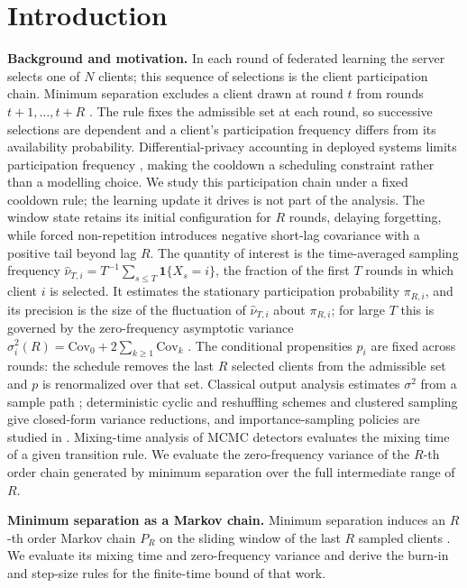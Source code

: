 \documentclass[twoside,11pt]{article}
\begin{document}
\section{Introduction}
\textbf{Background and motivation.} In each round of federated learning the server selects one of $N$ clients; this sequence of selections is the client participation chain. Minimum separation excludes a client drawn at round $t$ from rounds $t+1,\dots,t+R$ \citep{ref1}. The rule fixes the admissible set at each round, so successive selections are dependent and a client's participation frequency differs from its availability probability. Differential-privacy accounting in deployed systems limits participation frequency \citep{ref2,ref3}, making the cooldown a scheduling constraint rather than a modelling choice. We study this participation chain under a fixed cooldown rule; the learning update it drives is not part of the analysis. The window state retains its initial configuration for $R$ rounds,
delaying forgetting, while forced non-repetition introduces negative
short-lag covariance with a positive tail beyond lag $R$. The quantity of interest is the time-averaged sampling frequency $\hat\nu_{T,i}=T^{-1}\sum_{s\le T}\mathbf{1}\{X_s=i\}$, the fraction of the first $T$ rounds in which client $i$ is selected. It estimates the stationary participation probability $\pi_{R,i}$, and its precision is the size of the fluctuation of $\hat\nu_{T,i}$ about $\pi_{R,i}$; for large $T$ this is governed by the zero-frequency asymptotic variance $\sigma_i^{2}(R)=\mathrm{Cov}_0+2\sum_{k\ge1}\mathrm{Cov}_k$ \citep{ref4}. The conditional propensities $p_i$ are fixed across rounds: the schedule removes the last $R$ selected clients from the admissible set and $p$ is renormalized over that set. Classical output analysis estimates $\sigma^{2}$ from a sample path
\citep{ref4,ref5}; deterministic cyclic and reshuffling schemes
\citep{ref6,ref7} and clustered sampling \citep{ref8} give closed-form
variance reductions, and importance-sampling policies are studied in
\citep{ref9}. Mixing-time analysis of MCMC detectors \citep{ref10,ref11} evaluates
the mixing time of a given transition rule. We evaluate the zero-frequency
variance of the $R$-th order chain generated by minimum separation over the
full intermediate range of $R$.

\textbf{Minimum separation as a Markov chain.} Minimum separation induces an $R$-th order Markov chain $P_R$ on the sliding window of the last $R$ sampled clients \citep{ref1}. We evaluate its mixing time and zero-frequency variance and derive the burn-in and step-size rules for the finite-time bound of that work.
\end{document}
